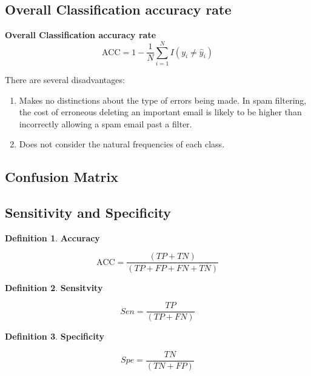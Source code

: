 \documentclass[twoside]{article}
\theoremstyle{definition}
\theoremstyle{definition}
\newtheorem*{proof1}{Definition}
\newenvironment{ddef}{\begin{dBox}\begin{proof1}}{\hfill{\scriptsize}\end{proof1}\end{dBox}}
\begin{document}
\subsection{Overall Classification accuracy rate}

\begin{def}
	\textbf{Overall Classification accuracy rate} 
	\begin{equation}
		\text{ACC} = 1 - \frac{1}{N} \sum^N_{i=1} I(y_i \neq \hat{y}_i)
	\end{equation}
\end{def}

There are several disadvantages:

\begin{enumerate}
	\item Makes no distinctions about the type of errors being made. In spam filtering, the cost of erroneous deleting an important email is likely to be higher than incorrectly allowing a spam email past a filter. 
	\item Does not consider the natural frequencies of each class.
\end{enumerate}
\subsection{Confusion Matrix}
\subsection{Sensitivity and Specificity}

\begin{ddef}
	\textbf{Accuracy} 

	\begin{equation}
		\text{ACC} = \frac{(TP + TN)}{(TP + FP + FN + TN)}
	\end{equation}
\end{ddef}

\begin{ddef}
	\textbf{Sensitvity}

	\begin{equation}
		Sen = \frac{TP}{(TP + FN)}
	\end{equation}
\end{ddef}

\begin{ddef}
	\textbf{Specificity}

	\begin{equation}
		Spe = \frac{TN}{(TN + FP)}
	\end{equation}
\end{ddef}
\end{document}
